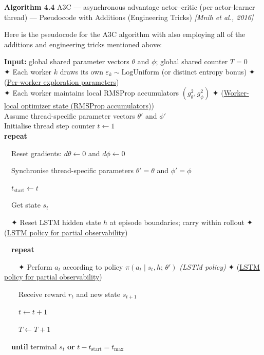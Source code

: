 \documentclass[11pt]{article}
\begin{document}
    \begin{pseudobox}

\textbf{Algorithm 4.4} A3C --- asynchronous advantage actor--critic (per
actor-learner thread) --- Pseudocode with Additions (Engineering Tricks)
\emph{{[}Mnih et al., 2016{]}}

\tcbline

Here is the pseudocode for the A3C algorithm with also employing all of
the additions and engineering tricks mentioned above:

\textbf{Input:} global shared parameter vectors \(\theta\) and \(\phi\);
global shared counter \(T = 0\)\\
✦ Each worker \(k\) draws its own
\(\varepsilon_k \sim \text{LogUniform}\) (or distinct entropy bonus) ✦
(\hyperref[trick-4-4-3]{Per-worker exploration parameters})\\
✦ Each worker maintains local RMSProp accumulators
\((g^2_\theta, g^2_\phi)\) ✦ (\hyperref[trick-4-4-2]{Worker-local
optimizer state (RMSProp accumulators)})\\
Assume thread-specific parameter vectors \(\theta'\) and \(\phi'\)\\
Initialise thread step counter \(t \leftarrow 1\)\\
\textbf{repeat}\\
\strut ~~Reset gradients: \(d\theta \leftarrow 0\) and
\(d\phi \leftarrow 0\)\\
\strut ~~Synchronise thread-specific parameters \(\theta' = \theta\) and
\(\phi' = \phi\)\\
\strut ~~\(t_{\text{start}} \leftarrow t\)\\
\strut ~~Get state \(s_t\)\\
\strut ~~✦ Reset LSTM hidden state \(h\) at episode boundaries; carry
within rollout ✦ (\hyperref[trick-4-4-4]{LSTM policy for partial
observability})\\
\strut ~~\textbf{repeat}\\
\strut ~~~~✦ Perform \(a_t\) according to policy
\(\pi(a_t \mid s_t, h;\, \theta')\) \emph{(LSTM policy)} ✦
(\hyperref[trick-4-4-4]{LSTM policy for partial observability})\\
\strut ~~~~Receive reward \(r_t\) and new state \(s_{t+1}\)\\
\strut ~~~~\(t \leftarrow t + 1\)\\
\strut ~~~~\(T \leftarrow T + 1\)\\
\strut ~~\textbf{until} terminal \(s_t\) \textbf{or}
\(t - t_{\text{start}} = t_{\max}\)\\

\end{pseudobox}
\end{document}
